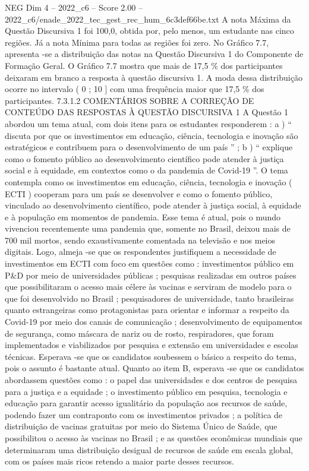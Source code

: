 \begin{textsample}{NEG Dim 4 – 2022\_c6 – Score 2.00 – 2022\_c6/enade\_2022\_tec\_gest\_rec\_hum\_6c3def66be.txt}
A nota Máxima da Questão Discursiva 1 foi 100,0, obtida por, pelo menos, um estudante nas cinco regiões.
Já a nota Mínima para todas as regiões foi zero.
No Gráfico 7.7, apresenta -se a distribuição das notas na Questão Discursiva 1 do Componente de Formação Geral.
O Gráfico 7.7 mostra que mais de 17,5 \% dos participantes deixaram em branco a resposta à questão discursiva 1.
A moda dessa distribuição ocorre no intervalo ( 0 ; 10 ] com uma frequência maior que 17,5 \% dos participantes. 7.3.1.2 COMENTÁRIOS SOBRE A CORREÇÃO DE CONTEÚDO DAS RESPOSTAS À QUESTÃO DISCURSIVA 1 A Questão 1 abordou um tema atual, com dois itens para os estudantes responderem : a ) “ discuta por que os investimentos em educação, ciência, tecnologia e inovação são estratégicos e contribuem para o desenvolvimento de um país ” ; b ) “ explique como o fomento público ao desenvolvimento científico pode atender à justiça social e à equidade, em contextos como o da pandemia de Covid-19 ”.
O tema contempla como os investimentos em educação, ciência, tecnologia e inovação ( ECTI ) cooperam para um país se desenvolver e como o fomento público, vinculado ao desenvolvimento científico, pode atender à justiça social, à equidade e à população em momentos de pandemia.
Esse tema é atual, pois o mundo vivenciou recentemente uma pandemia que, somente no Brasil, deixou mais de 700 mil mortos, sendo exaustivamente comentada na televisão e nos meios digitais.
Logo, almeja -se que os respondentes justifiquem a necessidade de investimentos em ECTI com foco em questões como : investimentos público em P\&D por meio de universidades públicas ; pesquisas realizadas em outros países que possibilitaram o acesso mais célere às vacinas e serviram de modelo para o que foi desenvolvido no Brasil ; pesquisadores de universidade, tanto brasileiras quanto estrangeiras como protagonistas para orientar e informar a respeito da Covid-19 por meio dos canais de comunicação ; desenvolvimento de equipamentos de segurança, como máscara de nariz ou de rosto, respiradores, que foram implementados e viabilizados por pesquisa e extensão em universidades e escolas técnicas.
Esperava -se que os candidatos soubessem o básico a respeito do tema, pois o assunto é bastante atual.
Quanto ao item B, esperava -se que os candidatos abordassem questões como : o papel das universidades e dos centros de pesquisa para a justiça e a equidade ; o investimento público em pesquisa, tecnologia e educação para garantir acesso igualitário da população aos recursos de saúde, podendo fazer um contraponto com os investimentos privados ; a política de distribuição de vacinas gratuitas por meio do Sistema Único de Saúde, que possibilitou o acesso às vacinas no Brasil ; e as questões econômicas mundiais que determinaram uma distribuição desigual de recursos de saúde em escala global, com os países mais ricos retendo a maior parte desses recursos.

\end{textsample}
